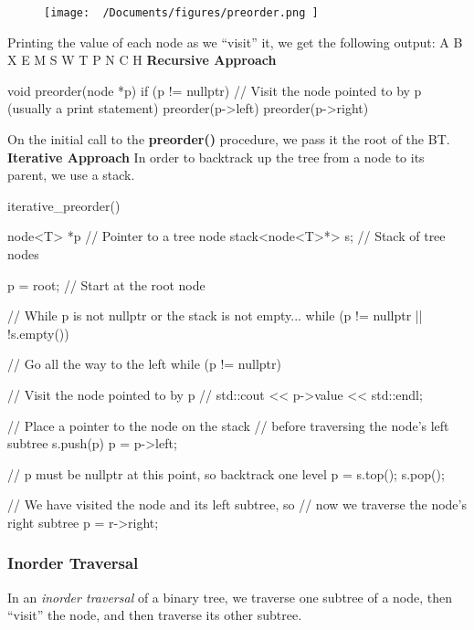 \documentclass{report}
\begin{document}
\begin{figure}[H]
\centering
\texttt{[image:  ~/Documents/figures/preorder.png ]}
\end{figure}
\bigbreak \noindent
Printing the value of each node as we ``visit'' it, we get the following output:
\bigbreak \noindent
A B X E M S W T P N C H
\bigbreak \noindent
\textbf{Recursive Approach}
\begin{cppcode}
  void preorder(node *p) {
    if (p != nullptr) {
      // Visit the node pointed to by p (usually a print statement)
      preorder(p->left)
      preorder(p->right)
    }
  }
\end{cppcode}
\bigbreak
\noindent On the initial call to the \textbf{preorder()} procedure, we pass it the root of the BT.
\bigbreak \noindent
{}
\newpage
\noindent \textbf{Iterative Approach}
\bigbreak \noindent
In order to backtrack up the tree from a node to its parent, we use a stack. 
\begin{cppcode}
iterative_preorder() {
  node<T> *p // Pointer to a tree node
  stack<node<T>*> s; // Stack of tree nodes

  p = root; // Start at the root node

  // While p is not nullptr or the stack is not empty...
  while (p != nullptr || !s.empty()) {

    // Go all the way to the left
    while (p != nullptr) {
      // Visit the node pointed to by p 
      // std::cout << p->value << std::endl;
      
      // Place a pointer to the node on the stack 
      // before traversing the node's left subtree
      s.push(p)
      p = p->left; 
    }

   // p must be nullptr at this point, so backtrack one level
   p = s.top();
   s.pop();

   // We have visited the node and its left subtree, so
   // now we traverse the node's right subtree
   p = r->right;
  }
}
\end{cppcode}
\subsubsection{Inorder Traversal}
In an \textit{inorder traversal} of a binary tree, we traverse one subtree of a node, then ``visit'' the node, and then traverse its other subtree.  \vspace{1.5mm}
\end{document}
